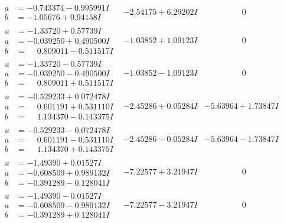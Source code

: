 \documentclass[1p]{elsarticle_modified}
\theoremstyle{definition}
\begin{document}
$$\begin{array}{c|c|c}
\begin{aligned}
a &= -0.743374 - 0.995991 I \\
b &= -1.05676 + 0.94158 I\end{aligned}
 & -2.54175 + 6.29202 I & \phantom{-0.000000 } 0 \\ \hline\begin{aligned}
u &= -1.33720 + 0.57739 I \\
a &= -0.039250 + 0.490500 I \\
b &= \phantom{-}0.809011 - 0.511517 I\end{aligned}
 & -1.03852 + 1.09123 I & \phantom{-0.000000 } 0 \\ \hline\begin{aligned}
u &= -1.33720 - 0.57739 I \\
a &= -0.039250 - 0.490500 I \\
b &= \phantom{-}0.809011 + 0.511517 I\end{aligned}
 & -1.03852 - 1.09123 I & \phantom{-0.000000 } 0 \\ \hline\begin{aligned}
u &= -0.529233 + 0.072478 I \\
a &= \phantom{-}0.601191 + 0.531110 I \\
b &= \phantom{-}1.134370 - 0.143375 I\end{aligned}
 & -2.45286 + 0.05284 I & -5.63964 + 1.73847 I \\ \hline\begin{aligned}
u &= -0.529233 - 0.072478 I \\
a &= \phantom{-}0.601191 - 0.531110 I \\
b &= \phantom{-}1.134370 + 0.143375 I\end{aligned}
 & -2.45286 - 0.05284 I & -5.63964 - 1.73847 I \\ \hline\begin{aligned}
u &= -1.49390 + 0.01527 I \\
a &= -0.608509 + 0.989132 I \\
b &= -0.391289 - 0.128041 I\end{aligned}
 & -7.22577 + 3.21947 I & \phantom{-0.000000 } 0 \\ \hline\begin{aligned}
u &= -1.49390 - 0.01527 I \\
a &= -0.608509 - 0.989132 I \\
b &= -0.391289 + 0.128041 I\end{aligned}
 & -7.22577 - 3.21947 I & \phantom{-0.000000 } 0 \\ \hline\begin{aligned}

\end{aligned}
\end{array}$$
\end{document}
